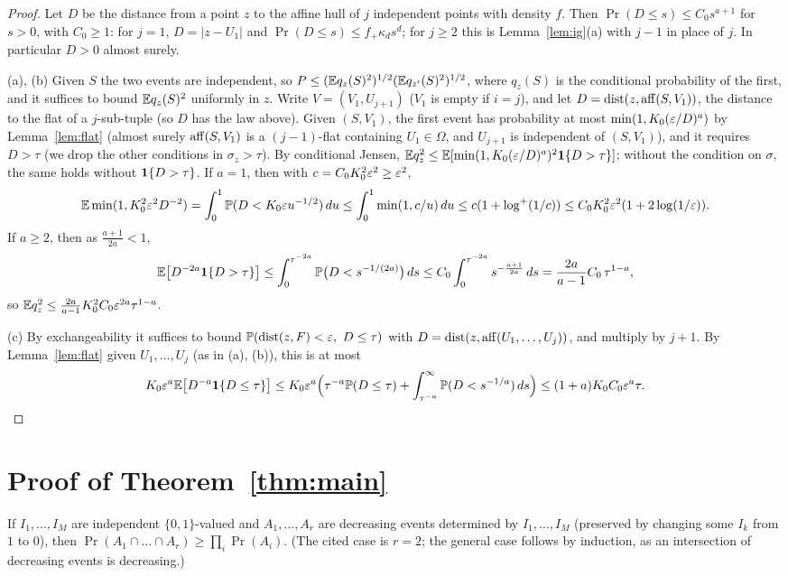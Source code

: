 \documentclass[11pt]{article}
\begin{document}
\begin{proof}
Let $D$ be the distance from a point $z$ to the affine hull of $j$ independent points with density $f$. Then
$\Pr(D\le s)\le C_0s^{a+1}$ for $s>0$, with $C_0\ge1$: for $j=1$, $D=|z-U_1|$ and $\Pr(D\le s)\le f_+\kappa_ds^d$; for $j\ge2$ this is
Lemma~\ref{lem:ig}(a) with $j-1$ in place of $j$. In particular $D>0$ almost surely.

(a), (b) Given $S$ the two events are independent, so $P\le(\mathbb{E} q_z(S)^2)^{1/2}(\mathbb{E} q_{z'}(S)^2)^{1/2}$, where $q_z(S)$ is the conditional
probability of the first, and it suffices to bound $\mathbb{E} q_z(S)^2$ uniformly in $z$. Write $V=(V_1,U_{j+1})$ ($V_1$ is empty if $i=j$), and let $D=\operatorname{dist}(z,\operatorname{aff}(S,V_1))$, the
distance to the flat of a $j$-sub-tuple (so $D$ has the law above). Given $(S,V_1)$, the first event has probability at most
$\min(1,K_0(\varepsilon/D)^a)$ by Lemma~\ref{lem:flat} (almost surely $\operatorname{aff}(S,V_1)$ is a $(j-1)$-flat containing $U_1\in\Omega$, and $U_{j+1}$
is independent of $(S,V_1)$), and it requires $D>\tau$ (we drop the other conditions in $\sigma_z>\tau$). By conditional Jensen,
$\mathbb{E} q_z^2\le\mathbb{E}[\min(1,K_0(\varepsilon/D)^a)^2\mathbf{1}\{D>\tau\}]$; without the condition on $\sigma$, the same holds without $\mathbf{1}\{D>\tau\}$.
If $a=1$, then with $c=C_0K_0^2\varepsilon^2\ge\varepsilon^2$,
\[
  \mathbb{E}\min(1,K_0^2\varepsilon^2D^{-2})=\int_0^1\mathbb{P}(D<K_0\varepsilon u^{-1/2})\,du\le\int_0^1\min(1,c/u)\,du\le c(1+\log^+(1/c))\le C_0K_0^2\varepsilon^2(1+2\log(1/\varepsilon)).
\]
If $a\ge2$, then as $\frac{a+1}{2a}<1$,
\[
  \mathbb{E}\bigl[D^{-2a}\mathbf{1}\{D>\tau\}\bigr]\le\int_0^{\tau^{-2a}}\mathbb{P}\bigl(D<s^{-1/(2a)}\bigr)\,ds\le C_0\int_0^{\tau^{-2a}}s^{-\frac{a+1}{2a}}\,ds=\frac{2a}{a-1}C_0\,\tau^{1-a},
\]
so $\mathbb{E} q_z^2\le\frac{2a}{a-1}K_0^2C_0\varepsilon^{2a}\tau^{1-a}$.

(c) By exchangeability it suffices to bound $\mathbb{P}(\operatorname{dist}(z,F)<\varepsilon,\ D\le\tau)$ with $D=\operatorname{dist}(z,\operatorname{aff}(U_1,\dots,U_j))$, and multiply by $j+1$.
By Lemma~\ref{lem:flat} given $U_1,\dots,U_j$ (as in (a), (b)), this is at most
\[
  K_0\varepsilon^a\mathbb{E}\bigl[D^{-a}\mathbf{1}\{D\le\tau\}\bigr]\le K_0\varepsilon^a\Bigl(\tau^{-a}\mathbb{P}(D\le\tau)+\int_{\tau^{-a}}^\infty\mathbb{P}(D<s^{-1/a})\,ds\Bigr)\le(1+a)K_0C_0\varepsilon^a\tau.
  \qedhere
\]
\end{proof}

\section{Proof of Theorem~\ref{thm:main}}\label{sec:proof}

\begin{thmH}
If $I_1,\dots,I_M$ are independent $\{0,1\}$-valued and $A_1, \dots, A_r$ are decreasing events determined by $I_1,\dots,I_M$ (preserved by changing
some $I_k$ from $1$ to $0$), then $\Pr(A_1 \cap \dots \cap A_r) \ge \prod_i \Pr(A_i)$. (The cited case is $r=2$; the
general case follows by induction, as an intersection of decreasing events is decreasing.)
\end{thmH}
\end{document}
